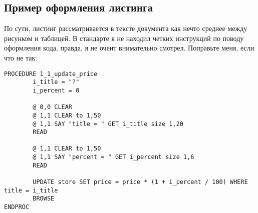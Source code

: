 \newpage

\subsection{Пример оформления листинга}

По сути, листинг рассматривается в тексте документа как нечто среднее между рисунком и таблицей.
В стандарте я не находил четких инструкций по поводу оформления кода, правда, я не очент внимательно смотрел.
Поправьте меня, если что не так: 

\begin{lstlisting}[caption=\mbox{Исходный код какой-то процедуры на FoxPro}]
PROCEDURE 1_1_update_price
        i_title = "?"
        i_percent = 0

        @ 0,0 CLEAR
        @ 1,1 CLEAR to 1,50
        @ 1,1 SAY "title = " GET i_title size 1,20
        READ
        
        @ 1,1 CLEAR to 1,50
        @ 1,1 SAY "percent = " GET i_percent size 1,6
        READ
        
        UPDATE store SET price = price * (1 + i_percent / 100) WHERE title = i_title
        BROWSE
ENDPROC
\end{lstlisting}




\newpage
